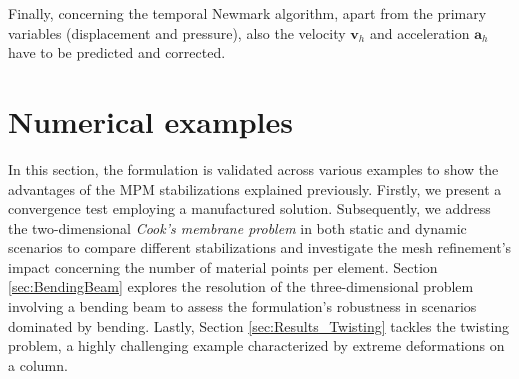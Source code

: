 \documentclass[11pt,english]{article}
\begin{document}
 
   Finally, concerning the temporal Newmark algorithm, apart from the primary variables (displacement and pressure), also the velocity $\boldsymbol{v}_h$ and acceleration $\boldsymbol{a}_h$ have to be predicted and corrected.
%
%
    
    \section{Numerical examples} \label{sec:NumericalExamples}
     
    In this section, the formulation is validated across various examples to show the advantages of the MPM stabilizations explained previously. Firstly, we present a convergence test employing a manufactured solution. Subsequently, we address the two-dimensional \textit{Cook's membrane problem}  in both static and dynamic scenarios to compare different stabilizations and investigate the mesh refinement's impact concerning the number of material points per element. Section \ref{sec:BendingBeam} explores the resolution of the three-dimensional problem involving a bending beam to assess the formulation's robustness in scenarios dominated by bending. Lastly, Section \ref{sec:Results_Twisting} tackles the twisting problem, a highly challenging example characterized by extreme deformations on a column.
    
    
%
%
    
\end{document}
